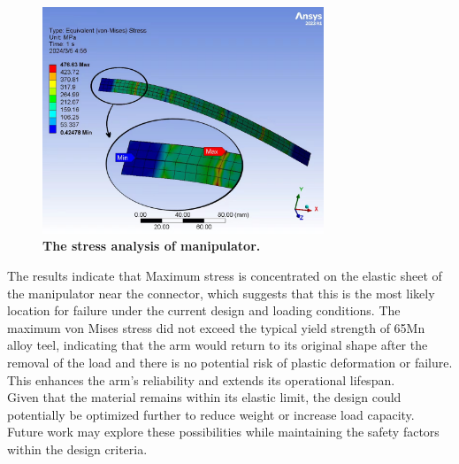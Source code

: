 \begin{itemize}
\begin{figure}[H]
        \centering 
        \captionsetup{labelsep=colon}
        \includegraphics[width=0.75\textwidth]{Image/Result/stress.jpg} 
        \caption[The stress analysis of manipulator]
        {\centering \textbf{The stress analysis of manipulator.}}
        \label{fig:stress}
    \end{figure}
\end{itemize}
The results indicate that Maximum stress is concentrated on the elastic sheet of the manipulator near the 
connector, which suggests that this is the most likely location for failure under the current design and 
loading conditions. The maximum von Mises stress did not exceed the typical yield strength of 65Mn alloy 
teel, indicating that the arm would return to its original shape after the removal of the load and there is 
no potential risk of plastic deformation or failure. This enhances the arm's reliability and extends its 
operational lifespan. \\
Given that the material remains within its elastic limit, the design could potentially be optimized further 
to reduce weight or increase load capacity. Future work may explore these possibilities while maintaining 
the safety factors within the design criteria.
